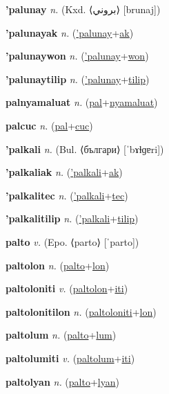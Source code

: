 \textbf{\hypertarget{'palunay}{'palunay}} \textit{n.} (Kxd. ⟨{\arabics{}بروني}⟩ [brunaj])


\textbf{\hypertarget{'palunayak}{'palunayak}} \textit{n.} (\hyperlink{'palunay}{'palunay}+\allowbreak \hyperlink{ak}{ak})


\textbf{\hypertarget{'palunaywon}{'palunaywon}} \textit{n.} (\hyperlink{'palunay}{'palunay}+\allowbreak \hyperlink{won}{won})


\textbf{\hypertarget{'palunaytilip}{'palunaytilip}} \textit{n.} (\hyperlink{'palunay}{'palunay}+\allowbreak \hyperlink{tilip}{tilip})


\textbf{\hypertarget{palnyamaluat}{palnyamaluat}} \textit{n.} (\hyperlink{pal}{pal}+\allowbreak \hyperlink{nyamaluat}{nyamaluat})


\textbf{\hypertarget{palcuc}{palcuc}} \textit{n.} (\hyperlink{pal}{pal}+\allowbreak \hyperlink{cuc}{cuc})


\textbf{\hypertarget{'palkali}{'palkali}} \textit{n.} (Bul. ⟨българи⟩ [ˈbɤɫɡɐri])


\textbf{\hypertarget{'palkaliak}{'palkaliak}} \textit{n.} (\hyperlink{'palkali}{'palkali}+\allowbreak \hyperlink{ak}{ak})


\textbf{\hypertarget{'palkalitec}{'palkalitec}} \textit{n.} (\hyperlink{'palkali}{'palkali}+\allowbreak \hyperlink{tec}{tec})


\textbf{\hypertarget{'palkalitilip}{'palkalitilip}} \textit{n.} (\hyperlink{'palkali}{'palkali}+\allowbreak \hyperlink{tilip}{tilip})


\textbf{\hypertarget{palto}{palto}} \textit{v.} (Epo. ⟨parto⟩ [ˈparto])


\textbf{\hypertarget{paltolon}{paltolon}} \textit{n.} (\hyperlink{palto}{palto}+\allowbreak \hyperlink{lon}{lon})


\textbf{\hypertarget{paltoloniti}{paltoloniti}} \textit{v.} (\hyperlink{paltolon}{paltolon}+\allowbreak \hyperlink{iti}{iti})


\textbf{\hypertarget{paltolonitilon}{paltolonitilon}} \textit{n.} (\hyperlink{paltoloniti}{paltoloniti}+\allowbreak \hyperlink{lon}{lon})


\textbf{\hypertarget{paltolum}{paltolum}} \textit{n.} (\hyperlink{palto}{palto}+\allowbreak \hyperlink{lum}{lum})


\textbf{\hypertarget{paltolumiti}{paltolumiti}} \textit{v.} (\hyperlink{paltolum}{paltolum}+\allowbreak \hyperlink{iti}{iti})


\textbf{\hypertarget{paltolyan}{paltolyan}} \textit{n.} (\hyperlink{palto}{palto}+\allowbreak \hyperlink{lyan}{lyan})



